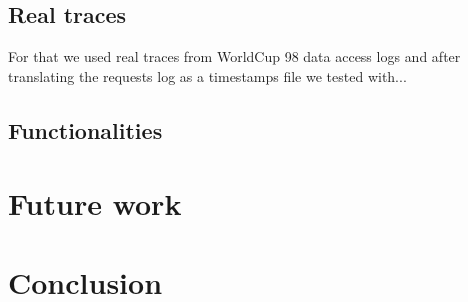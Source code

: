 \documentclass[a4paper]{IEEEtran}
\begin{document}
  \subsection{Real traces}
    For that we used real traces from WorldCup 98 
    data access logs \cite{wc98} and after translating the requests log as a 
    timestamps file we tested with...
  
  \subsection{Functionalities}
  

\section{Future work} \label{futurework}
  

\section{Conclusion} \label{conclu}





\end{document}
